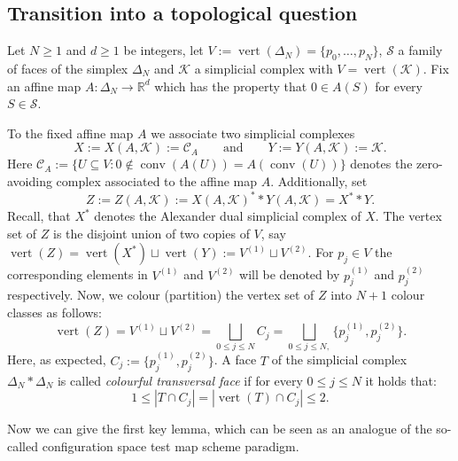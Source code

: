 \documentclass[a4paper,11pt,reqno, english]{amsart}
\theoremstyle{definition}
\theoremstyle{remark}
\newcommand\R{\mathbb R}
\newcommand\CC{\mathscr C}
\DeclareMathOperator{\vertex}{\mathrm{vert}}
\DeclareMathOperator{\conv}{\mathrm{conv}}
\begin{document}
\medskip
\subsection{Transition into a topological question}
Let $N\geq 1$ and $d\geq 1$ be integers, let $V:=\vertex(\Delta_N)=\{p_0,\dots,p_N\}$, $\mathcal{S}$ a family of faces of the simplex $\Delta_N$ and $\mathcal{K}$ a simplicial complex with $V=\vertex(\mathcal{K})$.
Fix an affine map $A\colon\Delta_N\longrightarrow\R^d$ which has the property that $0\in A(S)$ for every $S\in \mathcal{S}$.

\medskip
To the fixed affine map $A$ we associate two simplicial complexes
\[
	X:=X(A,\mathcal{K}):=\CC_A\qquad\text{and}\qquad Y:=Y(A,\mathcal{K}):=\mathcal{K}.
\]
Here $\CC_A:=\{U\subseteq V : 0\notin \conv(A(U))=A(\conv(U))\}$ denotes the zero-avoiding complex associated to the affine map $A$.
Additionally, set
\[
	Z:=Z(A,\mathcal{K}):=X(A,\mathcal{K})^* * Y(A,\mathcal{K})=X^**Y.
\]
Recall, that $X^*$ denotes the Alexander dual simplicial complex of $X$.
The vertex set of $Z$ is the disjoint union of two copies of $V$, say
$
	\vertex(Z)=\vertex(X^*) \sqcup \vertex (Y ):= V^{(1)}\sqcup  V^{(2)}
$.
For $p_{j}\in V$ the corresponding elements in $V^{(1)}$ and $V^{(2)}$ will be denoted by $p_{j}^{(1)}$ and $p_{j}^{(2)}$ respectively.
Now, we colour (partition) the vertex set of $Z$ into $N+1$ colour classes as follows:
\[
	\vertex(Z )= V^{(1)}\sqcup  V^{(2)} = \bigsqcup_{ 0\leq j\leq N} C_{j} = \bigsqcup_{ 0\leq j\leq N,}\{p_{j}^{(1)},p_{j}^{(2)}\}.
\]
Here, as expected,  $C_{j}:=\{p_{j}^{(1)},p_{j}^{(2)}\}$.
A face $T$ of the simplicial complex $\Delta_N*\Delta_N$ is called {\em colourful transversal face} if for every $0\leq j\leq N$ it holds that:
\[
	1\leq |  T\cap C_{j}|=| \vertex (T)\cap C_{j}|\leq 2.
\]

\medskip
Now we can give the first key lemma, which can be seen as an analogue of the so-called configuration space test map scheme paradigm.
\end{document}
